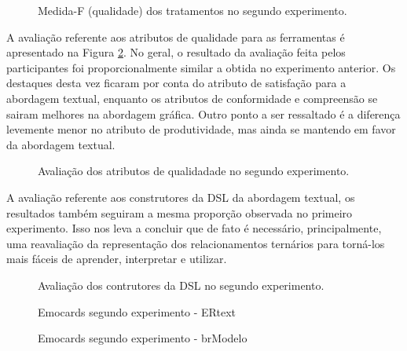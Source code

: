 \begin{figure}[!htb]
        \centering
        \caption{Medida-F (qualidade) dos tratamentos no segundo experimento.}
        \label{fig:boxplotMedidaF2}
        
\end{figure}

A avaliação referente aos atributos de qualidade para as ferramentas é apresentado na Figura \ref{fig:inst3GERALExp2}.
No geral, o resultado da avaliação feita pelos participantes foi proporcionalmente similar a obtida no experimento anterior. 
Os destaques desta vez ficaram por conta do atributo de satisfação para a abordagem textual, enquanto os atributos de conformidade e compreensão se sairam melhores na abordagem gráfica. 
Outro ponto a ser ressaltado é a diferença levemente menor no atributo de produtividade, mas ainda se mantendo em favor da abordagem textual.

\begin{figure}[!htb]
    \centering
    \caption{Avaliação dos atributos de qualidadade no segundo experimento.}
    \label{fig:inst3GERALExp2}
    
\end{figure}

A avaliação referente aos construtores da DSL da abordagem textual, os resultados também seguiram a mesma proporção observada no primeiro experimento.
Isso nos leva a concluir que de fato é necessário, principalmente, uma reavaliação da representação dos relacionamentos ternários para torná-los mais fáceis de aprender, interpretar e utilizar.

\begin{figure}[!htb]
    \centering
    \caption{Avaliação dos contrutores da DSL no segundo experimento.}
    \label{fig:inst4GERALExp2}
    
\end{figure}

\clearpage



\begin{figure}[!htb]
    \centering
    \caption{Emocards segundo experimento - ERtext}
    \label{fig:Emocards1_alt}
    
\end{figure}

\begin{figure}[!htb]
    \centering
    \caption{Emocards segundo experimento - brModelo}
    \label{fig:Emocards2_alt}
    
\end{figure}


